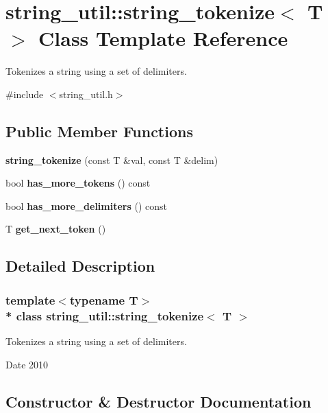 \section{string\+\_\+util\+:\+:string\+\_\+tokenize$<$ T $>$ Class Template Reference}
\label{classstring__util_1_1string__tokenize}


Tokenizes a string using a set of delimiters.  




{\ttfamily \#include $<$string\+\_\+util.\+h$>$}

\subsection*{Public Member Functions}
\begin{DoxyCompactItemize}
\item 
{\bf string\+\_\+tokenize} (const T \&val, const T \&delim)
\item 
bool {\bf has\+\_\+more\+\_\+tokens} () const 
\item 
bool {\bf has\+\_\+more\+\_\+delimiters} () const 
\item 
T {\bf get\+\_\+next\+\_\+token} ()
\end{DoxyCompactItemize}


\subsection{Detailed Description}
\subsubsection*{template$<$typename T$>$\\*
class string\+\_\+util\+::string\+\_\+tokenize$<$ T $>$}

Tokenizes a string using a set of delimiters. 

\begin{DoxyDate}{Date}
2010 
\end{DoxyDate}


\subsection{Constructor \& Destructor Documentation}
